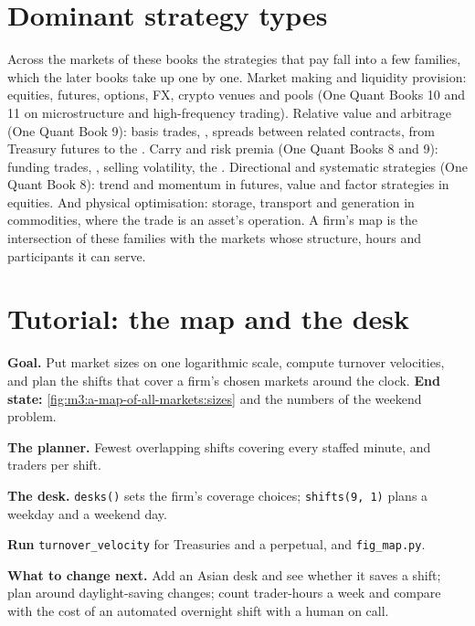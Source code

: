 \section{Dominant strategy types}

Across the markets of these books the strategies that pay fall into a few families, which the later books take up one by one. Market making and liquidity
provision: equities, futures, options, FX, crypto venues and pools (One Quant Books 10 and 11 on microstructure and high-frequency trading). Relative value and
arbitrage (One Quant Book 9): basis trades, , spreads between related contracts, from Treasury futures to the . Carry and risk premia (One Quant Books 8 and 9): funding
trades, , selling volatility, the . Directional and systematic strategies (One Quant Book 8): trend and momentum in futures, value and
factor strategies in equities. And physical optimisation: storage, transport and generation in commodities, where the trade is an asset's operation. A firm's map is
the intersection of these families with the markets whose structure, hours and participants it can serve.

\section{Tutorial: the map and the desk}\label{tut:m3:a-map-of-all-markets:map}

\begin{tutorial}
\textbf{Goal.} Put market sizes on one logarithmic scale, compute turnover velocities, and plan the shifts that cover a firm's chosen markets around the clock.
\textbf{End state:} \cref{fig:m3:a-map-of-all-markets:sizes} and the numbers of the weekend problem.
\begin{tutsteps}
\item \textbf{The planner.} Fewest overlapping shifts covering every staffed minute, and traders per shift.
\label{lst:m3:a-map-of-all-markets:shifts}
\item \textbf{The desk.} \texttt{desks()} sets the firm's coverage choices; \texttt{shifts(9, 1)} plans a weekday and a weekend day.
\item \textbf{Run} \texttt{turnover\_velocity} for Treasuries and a perpetual, and \texttt{fig\_map.py}.
\end{tutsteps}
\textbf{What to change next.} Add an Asian desk and see whether it saves a shift; plan around daylight-saving changes; count trader-hours a week and compare with
the cost of an automated overnight shift with a human on call.
\end{tutorial}

